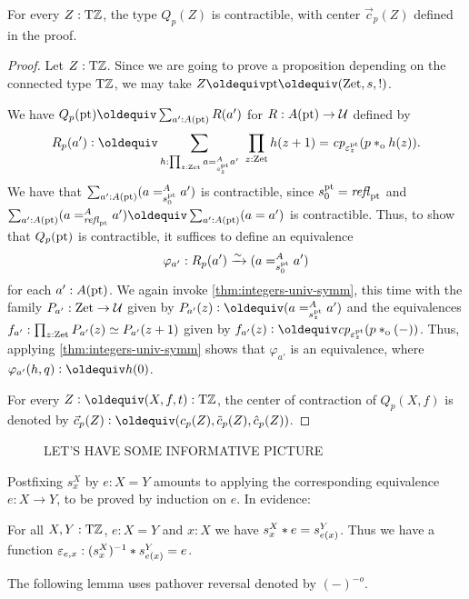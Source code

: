 \documentclass[a4,12pt]{amsart}
\begin{document}
\begin{lemma}\label{lem:guided-null-hmtps-dep}
  For every $Z:{\mathrm{T}\mathbb{Z}}$, the type $Q_p(Z)$ is contractible, 
  with center $\vec{c}_p(Z)$ defined in the proof.
\end{lemma}
\begin{proof}
  Let $Z:{\mathrm{T}\mathbb{Z}}$. Since we are going to prove a proposition
  depending on the connected type ${\mathrm{T}\mathbb{Z}}$,
  we may take $Z\jdeq\pt\jdeq(\zet,s,!)$.

  We have $Q_p(\pt)\jdeq \sum_{a':A(\pt)} R(a')$ for $R : A({\mathord{\mathrm{pt}}}) \to \mathcal{U}$ defined by
  \[
    R_p(a') \defeq \sum_{h : \prod_{z:\zet} a =^A_{s^\pt_z} a'}~
    \prod_{z:\zet} h(z+1) = \cp{\varepsilon^\pt_z}(p \cto h(z)).
  \]
  We have that $\sum_{a':A({\mathord{\mathrm{pt}}})} (a =^A_{s^{\mathord{\mathrm{pt}}}_0} {a'})$ is contractible,
  since $s^{\mathord{\mathrm{pt}}}_0 = \mathop{{\it refl}_{{\mathord{\mathrm{pt}}}}}$ and 
  $\sum_{a':A(\pt)} (a =^A_{\refl{\pt}} a') \jdeq \sum_{a':A(\pt)} (a = a')$
  is contractible.
  Thus, to show that $Q_p({\mathord{\mathrm{pt}}})$ is contractible,
  it suffices to define an equivalence
  \[
    \varphi_{a'} : R_p(a') \xrightarrow{\sim}{} (a =^A_{s^{\mathord{\mathrm{pt}}}_0} {a'})
  \]
  for each $a' : A({\mathord{\mathrm{pt}}})$.
  We again invoke \cref{thm:integers-univ-symm},
  this time with the family $P_{a'} : \mathrm{Zet} \to \mathcal{U}$ given 
  by $P_{a'}(z) \defeq (a =^A_{s^\pt_z} {a'})$
  and the equivalences $f_{a'} : \prod_{z:\mathrm{Zet}} P_{a'}(z)\simeq P_{a'}(z+1)$ 
  given by $f_{a'}(z) \defeq \cp{\varepsilon^\pt_z}(p \cto ({-}))$.
  Thus, applying \cref{thm:integers-univ-symm}
  shows that $\varphi_{a'}$ is an equivalence,
  where $\varphi_{a'}(h,q) \defeq h(0)$.

For every $Z\defeq(X,f,t):\TorZ$, the center of contraction of $Q_p(X,f)$ 
is denoted by $\vec{c}_p(Z)\defeq(c_p(Z),\tilde{c}_p(Z),\hat{c}_p(Z))$.
\end{proof}


\begin{figure}
\caption{\label{fig:TorZ-induction}LET'S HAVE SOME INFORMATIVE PICTURE}
\end{figure}

Postfixing $s^X_x$ by $e: X=Y$ amounts to
applying the corresponding equivalence $e: X\to Y$, to be proved
by induction on $e$. In evidence:

\begin{lemma}\label{lem:s-X-x-*-e}
  For all $X,Y:{\mathrm{T}\mathbb{Z}}$, $e: X=Y$ and $x:X$ we have $s^X_x * e = s^Y_{e(x)}$.
  Thus we have a function $\varepsilon_{e,x} : (s^X_x)^{-1} * s^Y_{e(x)} = e$.
\end{lemma}

The following lemma uses pathover reversal denoted by $({-})^{-o}$.
\end{document}
